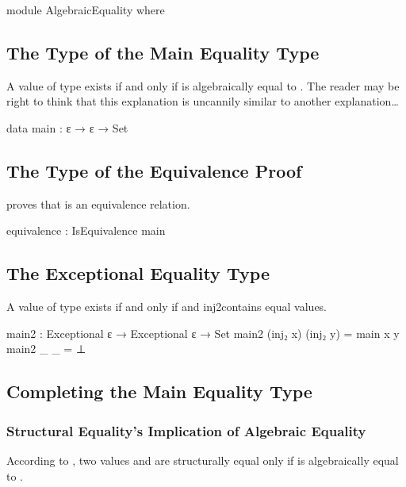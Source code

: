 \documentclass{report}
\begin{document}
\begin{code}
  module AlgebraicEquality where
\end{code}

\subsection{The Type of the Main Equality Type}
A value of type    exists if and only if  is algebraically equal to .  The reader may be right to think that this explanation is uncannily similar to another explanation\ldots{}

\begin{code}
    data main : ε → ε → Set
\end{code}

\subsection{The Type of the Equivalence Proof}
 proves that  is an equivalence relation.

\begin{code}
    equivalence : IsEquivalence main
\end{code}

\subsection{The Exceptional Equality Type}
A value of type    exists if and only if  and  \glspl{inj2contain} equal values.

\begin{code}
    main2 : Exceptional ε → Exceptional ε → Set
    main2 (inj₂ x) (inj₂ y) = main x y
    main2 _ _ = ⊥
\end{code}

\subsection{Completing the Main Equality Type}

\subsubsection{Structural Equality's Implication of Algebraic Equality}
According to , two  values  and  are structurally equal only if  is algebraically equal to .
\end{document}

